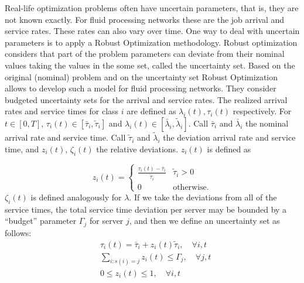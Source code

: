 \documentclass[11pt,a4paper,titlepage]{article}
\theoremstyle{definition}
\theoremstyle{plain}
\begin{document}
    Real-life optimization problems often have uncertain parameters,
    that is, they are not known exactly.
    For fluid processing networks these are the job arrival and service rates.
    These rates can also vary over time.
    One way to deal with uncertain parameters is to apply a Robust Optimization methodology.
    Robust optimization considers that part of the problem parameters can deviate from their nominal values taking the values in the some set,
    called the uncertainty set.
    Based on the original (nominal) problem and on the uncertainty set Robust Optimization allows
    \Autocite{bertsimas2014robust} to develop such a model for
    fluid processing networks.
    They consider budgeted uncertainty sets for the arrival and service rates.
    The realized arrival rates and service times for class $i$ are
    defined as $\lambda_i(t), \tau_i(t)$ respectively.
    For $t \in [0,T]$,
    $\tau_i(t) \in [\bar{\tau}_i, \tilde{\tau}_i]$ and
    $\lambda_i(t) \in [\bar{\lambda}_i, \tilde{\lambda}_i]$.
    Call $\bar{\tau}_i$ and $\bar{\lambda}_i$ the nominal arrival rate and service time.
    Call $\tilde{\tau}_i$ and $\tilde{\lambda}_i$ the deviation arrival rate and service time,
    and $z_i(t)$, $\zeta_i(t)$ the relative deviations.
    $z_i(t)$ is defined as

    \begin{equation}
        z_i(t) =
        \begin{cases}
            \frac{\tau_i(t) - \bar{\tau}_i}{\tilde{\tau}_i} & \tilde{\tau}_i > 0 \\
            0 & \text{otherwise.}
        \end{cases}
    \end{equation}
    $\zeta_i(t)$ is defined analogously for $\lambda$.
    If we take the deviations from all of the service times,
    the total service time deviation per server may be bounded by a ``budget''
    parameter $\Gamma_j$ for server $j$,
    and then we define an uncertainty set as follows:
    \begin{equation}
        \begin{split}
            &\tau_{i}(t)=\bar{\tau}_{i}+z_{i}(t) \tilde{\tau}_{i}, \quad \forall i, t \\
            &\sum_{i: s(i)=j} z_{i}(t) \leq \Gamma_{j}, \quad \forall j, t \\
            &0 \leq z_{i}(t) \leq 1, \quad \forall i, t
        \end{split}
    \end{equation}
\end{document}
